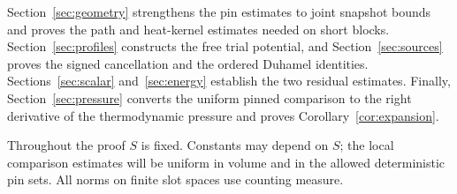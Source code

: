 Section~\ref{sec:geometry} strengthens the pin estimates to joint
snapshot bounds and proves the path and heat-kernel estimates needed
on short blocks. Section~\ref{sec:profiles} constructs the free trial
potential, and Section~\ref{sec:sources} proves the signed cancellation
and the ordered Duhamel identities. Sections~\ref{sec:scalar}
and~\ref{sec:energy} establish the two residual estimates. Finally,
Section~\ref{sec:pressure} converts the uniform pinned comparison to
the right derivative of the thermodynamic pressure and proves
Corollary~\ref{cor:expansion}.

Throughout the proof $S$ is fixed. Constants may depend on $S$;
the local comparison estimates will be uniform in volume and in the
allowed deterministic pin sets. All norms on finite slot spaces use
counting measure.
